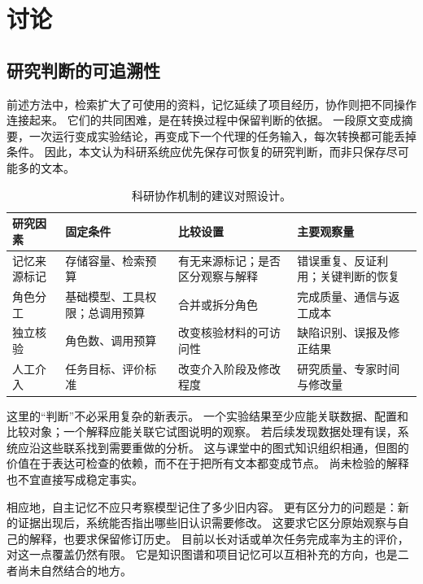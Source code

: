 \section{讨论}
\subsection{研究判断的可追溯性}
前述方法中，检索扩大了可使用的资料，记忆延续了项目经历，协作则把不同操作连接起来。
它们的共同困难，是在转换过程中保留判断的依据。
一段原文变成摘要，一次运行变成实验结论，再变成下一个代理的任务输入，每次转换都可能丢掉条件。
因此，本文认为科研系统应优先保存可恢复的研究判断，而非只保存尽可能多的文本。

\begin{table}[t]\centering\tabletext
\caption{科研协作机制的建议对照设计。}
\label{tab:agenda}
\begin{tabularx}{\textwidth}{@{}L{25mm}L{37mm}L{48mm}Y@{}}\toprule
\textbf{研究因素} & \textbf{固定条件} & \textbf{比较设置} & \textbf{主要观察量}\\\midrule
记忆来源标记 & 存储容量、检索预算 & 有无来源标记；\newline{}是否区分观察与解释 & 错误重复、反证利用；\newline{}关键判断的恢复\\[6pt]
角色分工 & 基础模型、工具权限；\newline{}总调用预算 & 合并或拆分角色 & 完成质量、通信与返工成本\\[6pt]
独立核验 & 角色数、调用预算 & 改变核验材料的可访问性 & 缺陷识别、误报及修正结果\\[6pt]
人工介入 & 任务目标、评价标准 & 改变介入阶段及修改程度 & 研究质量、专家时间与修改量\\\bottomrule
\end{tabularx}
\end{table}

这里的“判断”不必采用复杂的新表示。
一个实验结果至少应能关联数据、配置和比较对象；一个解释应能关联它试图说明的观察。
若后续发现数据处理有误，系统应沿这些联系找到需要重做的分析。
这与课堂中的图式知识组织相通，但图的价值在于表达可检查的依赖，而不在于把所有文本都变成节点。
尚未检验的解释也不宜直接写成稳定事实。

相应地，自主记忆不应只考察模型记住了多少旧内容。
更有区分力的问题是：新的证据出现后，系统能否指出哪些旧认识需要修改。
这要求它区分原始观察与自己的解释，也要求保留修订历史。
目前以长对话或单次任务完成率为主的评价，对这一点覆盖仍然有限。
它是知识图谱和项目记忆可以互相补充的方向，也是二者尚未自然结合的地方。

